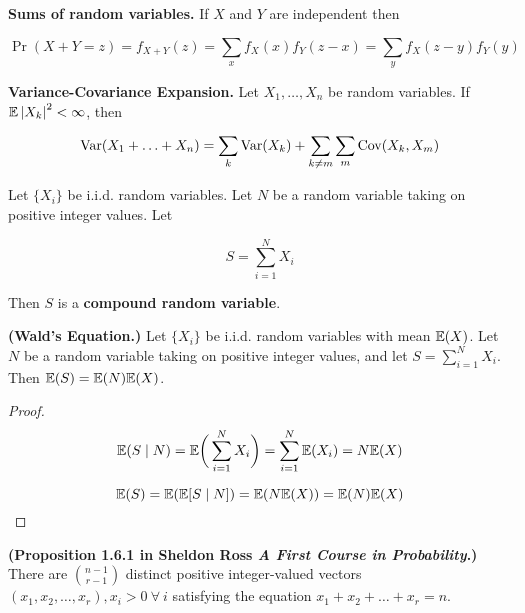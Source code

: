 \begin{theorem}\textbf{Sums of random variables.} If \(X\) and \(Y\) are independent then

\[
\Pr(X + Y = z) = f_{X +Y}(z) = \sum_x f_X(x) f_Y(z-x) = \sum_y f_X(z - y) f_Y(y)
\]

\end{theorem}

\begin{proposition}\textbf{Variance-Covariance Expansion.} Let \(X_1, \ldots, X_n\) be random variables. If \(\E \left|X_k \right|^2 < \infty\), then 

\[
\Var(X_1 + \ldots + X_n) = \sum_k \Var(X_k) + \sum_{k \neq m} \sum_m \Cov(X_k, X_m)
\]
\end{proposition}

\begin{definition}Let \(\{X_i\}\) be i.i.d. random variables. Let \(N\) be a random variable taking on positive integer values. Let

\[
S = \sum_{i=1}^N X_i
\]

Then \(S\) is a \textbf{compound random variable}.

\end{definition}

\begin{proposition} \textbf{(Wald's Equation.)} Let \(\{X_i\}\) be i.i.d. random variables with mean \(\E(X)\). Let \(N\) be a random variable taking on positive integer values, and let \(S = \sum_{i=1}^N X_i\). Then \(\E(S) = \E(N) \E(X)\).

\begin{proof}

\[
\E(S \mid N) = \E \bigg( \sum_{i=1}^N X_i \bigg) = \sum_{i=1}^N \E(X_i) = N \E(X) 
\]

\[
\E(S) = \E(\E[S \mid N]) = \E(N \E(X)) = \E(N) \E(X)
\]

\end{proof}

\end{proposition}

\begin{proposition} \label{prob.ross1.6.1} \textbf{(Proposition 1.6.1 in Sheldon Ross \textit{A First Course in Probability}.)} There are \(\binom{n-1}{r-1}\) distinct positive integer-valued vectors \((x_1, x_2, \ldots, x_r), x_i > 0 \ \forall \ i\) satisfying the equation \(x_1 + x_2 + \ldots + x_r = n\).

\end{proposition}

